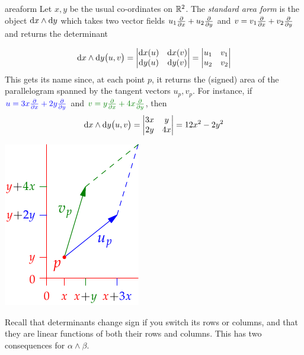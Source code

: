 \begin{example}{}{areaform}
	Let $x,y$ be the usual co-ordinates on $\mathbb{R}^2$. The \emph{standard area form} is the object ${\mathrm{d} x}\wedge{\mathrm{d}y}$ which takes two vector fields $u_1\frac{\partial }{\partial x}+u_2\frac{\partial }{\partial y}$ and $v=v_1\frac{\partial }{\partial x}+v_2\frac{\partial }{\partial y}$ and returns the determinant\par
	\begin{minipage}[t]{0.73\linewidth}\vspace{-8pt}
		\[
			{\mathrm{d} x}\wedge{\mathrm{d}y}\bigl(u,v\bigr)=
			\begin{vmatrix}
				{\mathrm{d}x}(u)&{\mathrm{d} x}(v)\\
				{\mathrm{d} y}(u)&{\mathrm{d} y}(v)
			\end{vmatrix}
			=\begin{vmatrix}
				u_1&v_1\\
				u_2&v_2
			\end{vmatrix}
		\]
		This gets its name since, at each point $p$, it returns the (signed) area of the parallelogram spanned by the tangent vectors $u_p,v_p$.\smallbreak
		For instance, if $\textcolor{blue}{u=3x\frac{\partial }{\partial x}+2y\frac{\partial }{\partial y}}$ and $\textcolor{Green}{v=y\partials x+4x\partials y}$, then
		\[
			{\mathrm{d} x}\wedge{\mathrm{d}y}\bigl(u,v\bigr)=
			\begin{vmatrix}
				3x&y\\
				2y&4x
			\end{vmatrix}
			=12x^2-2y^2
		\]
	\end{minipage}
	\hfill
	\begin{minipage}[t]{0.26\linewidth}\vspace{0pt}
		\flushright\includegraphics{forms-para}
	\end{minipage}
\end{example}

Recall that determinants change sign if you switch its rows or columns, and that they are linear functions of both their rows and columns. This has two consequences for $\alpha\wedge\beta$.

